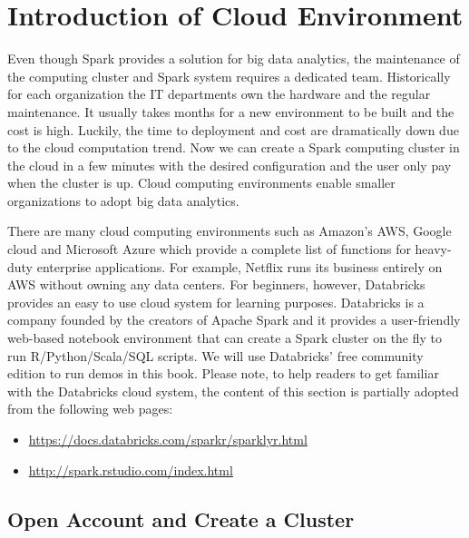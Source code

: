 \documentclass[
  12pt,
]{krantz}
\providecommand{\tightlist}{%
  \setlength{\itemsep}{0pt}\setlength{\parskip}{0pt}}
\begin{document}
\hypertarget{CloudEnvironment}{%
\section{Introduction of Cloud Environment}\label{CloudEnvironment}}

Even though Spark provides a solution for big data analytics, the maintenance of the computing cluster and Spark system requires a dedicated team. Historically for each organization the IT departments own the hardware and the regular maintenance. It usually takes months for a new environment to be built and the cost is high. Luckily, the time to deployment and cost are dramatically down due to the cloud computation trend. Now we can create a Spark computing cluster in the cloud in a few minutes with the desired configuration and the user only pay when the cluster is up. Cloud computing environments enable smaller organizations to adopt big data analytics.

There are many cloud computing environments such as Amazon's AWS, Google cloud and Microsoft Azure which provide a complete list of functions for heavy-duty enterprise applications. For example, Netflix runs its business entirely on AWS without owning any data centers. For beginners, however, Databricks provides an easy to use cloud system for learning purposes. Databricks is a company founded by the creators of Apache Spark and it provides a user-friendly web-based notebook environment that can create a Spark cluster on the fly to run R/Python/Scala/SQL scripts. We will use Databricks' free community edition to run demos in this book. Please note, to help readers to get familiar with the Databricks cloud system, the content of this section is partially adopted from the following web pages:

\begin{itemize}
\tightlist
\item
  \url{https://docs.databricks.com/sparkr/sparklyr.html}
\item
  \url{http://spark.rstudio.com/index.html}
\end{itemize}

\hypertarget{open-account-and-create-a-cluster}{%
\subsection{Open Account and Create a Cluster}\label{open-account-and-create-a-cluster}}
\end{document}
